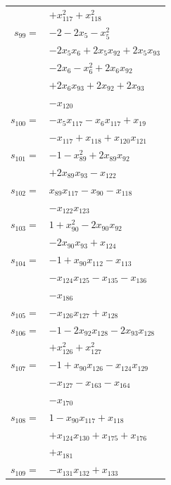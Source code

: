 \begin{longtable}{@{}r@{\;}l@{}}
 & \(\displaystyle +x_{117}^{2} +x_{118}^{2}\) \\[3pt]
\(s_{99}=\) & \(\displaystyle -2 -2x_{5} -x_{5}^{2}\) \\
 & \(\displaystyle -2x_{5}x_{6} +2x_{5}x_{92} +2x_{5}x_{93}\) \\
 & \(\displaystyle -2x_{6} -x_{6}^{2} +2x_{6}x_{92}\) \\
 & \(\displaystyle +2x_{6}x_{93} +2x_{92} +2x_{93}\) \\
 & \(\displaystyle -x_{120}\) \\[3pt]
\(s_{100}=\) & \(\displaystyle -x_{5}x_{117} -x_{6}x_{117} +x_{19}\) \\
 & \(\displaystyle -x_{117} +x_{118} +x_{120}x_{121}\) \\[3pt]
\(s_{101}=\) & \(\displaystyle -1 -x_{89}^{2} +2x_{89}x_{92}\) \\
 & \(\displaystyle +2x_{89}x_{93} -x_{122}\) \\[3pt]
\(s_{102}=\) & \(\displaystyle x_{89}x_{117} -x_{90} -x_{118}\) \\
 & \(\displaystyle -x_{122}x_{123}\) \\[3pt]
\(s_{103}=\) & \(\displaystyle 1 +x_{90}^{2} -2x_{90}x_{92}\) \\
 & \(\displaystyle -2x_{90}x_{93} +x_{124}\) \\[3pt]
\(s_{104}=\) & \(\displaystyle -1 +x_{90}x_{112} -x_{113}\) \\
 & \(\displaystyle -x_{124}x_{125} -x_{135} -x_{136}\) \\
 & \(\displaystyle -x_{186}\) \\[3pt]
\(s_{105}=\) & \(\displaystyle -x_{126}x_{127} +x_{128}\) \\[3pt]
\(s_{106}=\) & \(\displaystyle -1 -2x_{92}x_{128} -2x_{93}x_{128}\) \\
 & \(\displaystyle +x_{126}^{2} +x_{127}^{2}\) \\[3pt]
\(s_{107}=\) & \(\displaystyle -1 +x_{90}x_{126} -x_{124}x_{129}\) \\
 & \(\displaystyle -x_{127} -x_{163} -x_{164}\) \\
 & \(\displaystyle -x_{170}\) \\[3pt]
\(s_{108}=\) & \(\displaystyle 1 -x_{90}x_{117} +x_{118}\) \\
 & \(\displaystyle +x_{124}x_{130} +x_{175} +x_{176}\) \\
 & \(\displaystyle +x_{181}\) \\[3pt]
\(s_{109}=\) & \(\displaystyle -x_{131}x_{132} +x_{133}\) \\[3pt]

\end{longtable}

